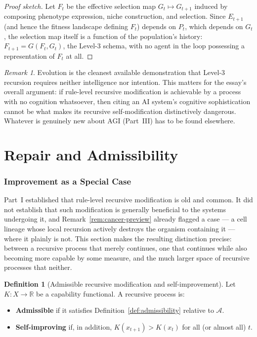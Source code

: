 \documentclass[12pt,a4paper]{article}
\theoremstyle{plain}
\theoremstyle{definition}
\newtheorem{definition}[theorem]{Definition}
\theoremstyle{remark}
\newtheorem{remark}[theorem]{Remark}
\newcommand{\Adm}{\mathcal{A}}
\begin{document}
\begin{proof}[Proof sketch]
Let $F_t$ be the effective selection map $G_t \mapsto G_{t+1}$ induced by composing phenotype expression, niche construction, and selection. Since $E_{t+1}$ (and hence the fitness landscape defining $F_t$) depends on $P_t$, which depends on $G_t$, the selection map itself is a function of the population's history: $F_{t+1} = G(F_t, G_t)$, the Level-3 schema, with no agent in the loop possessing a representation of $F_t$ at all.
\end{proof}

\begin{remark}
Evolution is the cleanest available demonstration that Level-3 recursion requires neither intelligence nor intention. This matters for the essay's overall argument: if rule-level recursive modification is achievable by a process with no cognition whatsoever, then citing an AI system's cognitive sophistication cannot be what makes its recursive self-modification distinctively dangerous. Whatever is genuinely new about AGI (Part~III) has to be found elsewhere.
\end{remark}

\part{Repair and Admissibility}

\section{Improvement as a Special Case}
\label{sec:improvement-special-case}

Part~I established that rule-level recursive modification is old and common. It did not establish that such modification is generally beneficial to the systems undergoing it, and Remark~\ref{rem:cancer-preview} already flagged a case — a cell lineage whose local recursion actively destroys the organism containing it — where it plainly is not. This section makes the resulting distinction precise: between a recursive process that merely continues, one that continues while also becoming more capable by some measure, and the much larger space of recursive processes that neither.

\begin{definition}[Admissible recursive modification and self-improvement]
\label{def:arm-and-rsi}
Let $K: X \to \mathbb{R}$ be a capability functional. A recursive process is:
\begin{itemize}
  \item \textbf{Admissible} if it satisfies Definition~\ref{def:admissibility} relative to $\Adm$.
  \item \textbf{Self-improving} if, in addition, $K(x_{t+1}) > K(x_t)$ for all (or almost all) $t$.
\end{itemize}
\end{definition}
\end{document}
